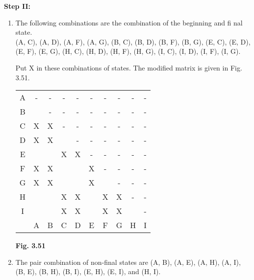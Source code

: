 \documentclass[8pt]{beamer}
\begin{document}
\begin{frame}
\small{
\textbf{Step II:}
\begin{enumerate}
  \item The following combinations are the combination of the beginning and fi nal state.\\
(A, C), (A, D), (A, F), (A, G), (B, C), (B, D), (B, F), (B, G), (E, C), (E, D), (E, F), (E, G), (H, C),
(H, D), (H, F), (H, G), (I, C), (I, D), (I, F), (I, G).

Put X in these combinations of states. The modified matrix is given in Fig. 3.51.\\

\pause
\begin{center}
\begin{tabular}{cccccccccc}
\hline
A& -& -& -& -& -& -& -& -& -\\
B&  & -& -& -& -& -& -& -& -\\
C&X &X & -& -& -& -& -& -& -\\
D&X &X &  & -& -& -& -& -& -\\
E&  &  &X &X & -& -& -& -& -\\
F&X &X &  &  &X & -& -& -& -\\
G&X &X &  &  &X &  & -& -& -\\
H&  &  &X &X &  &X &X & -& -\\
I&  &  &X &X &  &X &X &  & -\\
 & A& B& C& D& E& F& G& H& I\\
 \hline

 \hline

 \hline

 \hline
\end{tabular}
\end{center}
\begin{center}
  \textbf{Fig. 3.51}\\
\end{center}
  \item The pair combination of non-final states are (A, B), (A, E), (A, H), (A, I), (B, E), (B, H), (B, I),
(E, H), (E, I), and (H, I).
\end{enumerate}
}
\end{frame}
\end{document}

